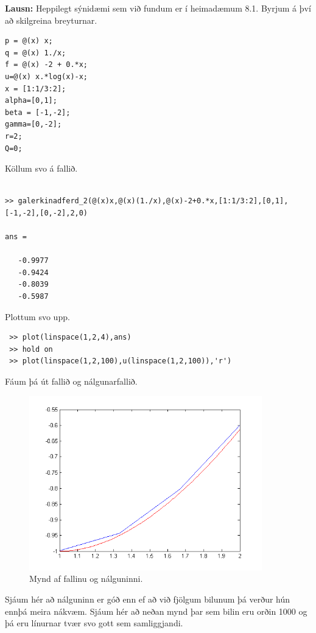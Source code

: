 \documentclass[11pt,a4paper,titlepage]{article}
\begin{document}
\textbf{Lausn:} 
Heppilegt sýnidæmi sem við fundum er í heimadæmum 8.1. Byrjum á því að skilgreina breyturnar. 
\begin{verbatim}
p = @(x) x;
q = @(x) 1./x;
f = @(x) -2 + 0.*x;
u=@(x) x.*log(x)-x;
x = [1:1/3:2];
alpha=[0,1];
beta = [-1,-2];
gamma=[0,-2];
r=2;
Q=0;
\end{verbatim}
Köllum svo á fallið. 
\begin{verbatim}

>> galerkinadferd_2(@(x)x,@(x)(1./x),@(x)-2+0.*x,[1:1/3:2],[0,1],[-1,-2],[0,-2],2,0)

ans =

   -0.9977
   -0.9424
   -0.8039
   -0.5987
\end{verbatim}
 Plottum svo upp. 
 \begin{verbatim}
 >> plot(linspace(1,2,4),ans)
 >> hold on
 >> plot(linspace(1,2,100),u(linspace(1,2,100)),'r')
 \end{verbatim}
 
 Fáum þá út fallið og nálgunarfallið. 
 
  \begin{figure}[h!]
      \centering
      \includegraphics[width=0.9\textwidth]{nalgun1_4.png}
      \caption{Mynd af fallinu og nálguninni.}
      \label{fig:awesome_image1}
  \end{figure}
  
  Sjáum hér að nálguninn er góð enn ef að við fjölgum bilunum þá verður hún ennþá meira nákvæm.  Sjáum hér að neðan mynd þar sem bilin eru orðin 1000 og þá eru línurnar tvær svo gott sem samliggjandi. 
  
\end{document}
